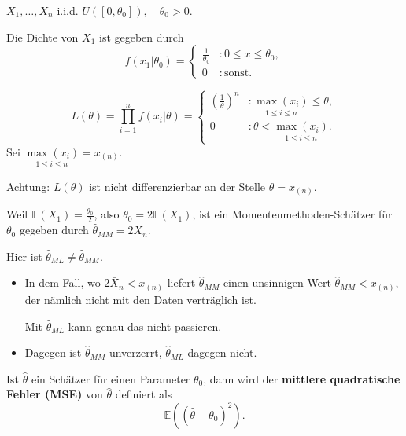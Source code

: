 \documentclass{tstextbook}
\newcommand{\E}{\mathbb E}
\begin{document}
\begin{example}
	$ X_1,\ldots,X_n $ i.i.d. $ U([0,\theta_0]), \quad \theta_0 > 0 $. 
	
	Die Dichte von $ X_1 $ ist gegeben durch 
	\[
	f(x_1|\theta_0)=\left\{\begin{array}{ll}
		\frac{1}{\theta_0} & \colon 0\le x\le \theta_0, \\
		0 & \colon \text{sonst} .
	\end{array}\right .
	\]
	
	
	\[
	L(\theta) = \prod_{i=1}^{n} f(x_i|\theta)=\left\{\begin{array}{ll}
		\left(\frac{1}{\theta}\right)^n & \colon \underset{1\le i\le n}{\max(x_i)} \le \theta, \\
		0 & \colon \theta < \underset{1\le i\le n}{\max(x_i)} .
	\end{array}\right .
	\]
	Sei $ \underset{1\le i\le n}{\max(x_i)} = x_{(n)} $. 
	
	Achtung: $ L(\theta) $ ist nicht differenzierbar an der Stelle $ \theta = x_{(n)} $. 
	
	Weil $ \E(X_1) = \frac{\theta_0}{2} $, also $ \theta_0 = 2 \E (X_1) $, ist ein Momentenmethoden-Schätzer für $ \theta_0 $ gegeben durch $ \hat{\theta}_{MM} = 2 \bar{X}_n $.
	
	Hier ist $ \hat{\theta}_{ML} \ne \hat{\theta}_{MM} $.
	
	\begin{itemize}
		\item In dem Fall, wo $ 2\bar{X}_n < x_{(n)} $ liefert $ \hat{\theta}_{MM} $ einen unsinnigen Wert $ \hat{\theta}_{MM} < x_{(n)} $, der nämlich nicht mit den Daten verträglich ist. 
		
		Mit $ \hat{\theta}_{ML} $ kann genau das nicht passieren.
		\item Dagegen ist $ \hat{\theta}_{MM} $ unverzerrt, $ \hat{\theta}_{ML} $ dagegen nicht.
	\end{itemize}
	
\end{example}

\begin{definition}
	Ist $ \hat{\theta} $ ein Schätzer für einen Parameter $ \theta_0 $, dann wird der \textbf{mittlere quadratische Fehler (MSE)}  von $ \hat{\theta} $ definiert als 
	\[
	\E\left(\left(\hat{\theta}-\theta_0\right)^2\right).
	\]
\end{definition}
\end{document}
